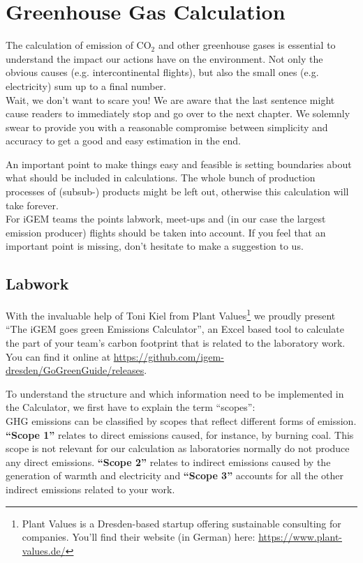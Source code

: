 
\chapter{Greenhouse Gas Calculation}\label{chap:calculation}

The calculation of emission of CO$_2$ and other greenhouse gases is essential to understand the impact our actions have on the environment. Not only the obvious causes (e.g. intercontinental flights), but also the small ones (e.g. electricity) sum up to a final number. \\
Wait, we don't want to scare you! We are aware that the last sentence might cause readers to immediately stop and go over to the next chapter.  We solemnly swear to provide you with a reasonable compromise between simplicity and accuracy to get a good and easy estimation in the end. 


An important point to make things easy and feasible is setting boundaries about what should be included in calculations. The whole bunch of production processes of (subsub-) products might be left out, otherwise this calculation will take forever. \\
For iGEM teams the points labwork, meet-ups and (in our case the largest emission producer) flights should be taken into account. If you feel that an important point is missing, don't hesitate to make a suggestion to us.

\section{Labwork}

With the invaluable help of Toni Kiel from Plant Values\footnote{Plant Values is a Dresden-based startup offering sustainable consulting for companies. You'll find their website (in German) here: \url{https://www.plant-values.de/}} we proudly present “The iGEM goes green Emissions Calculator”, an Excel based tool to calculate the part of your team's carbon footprint that is related to the laboratory work.  You can find it online at \url{https://github.com/igem-dresden/GoGreenGuide/releases}.


To understand the structure and which information need to be implemented in the Calculator, we first have to explain the term “scopes”: \\
GHG emissions can be classified by scopes that reflect different forms of emission. \textbf{“Scope 1”} relates to direct emissions caused, for instance, by burning coal. This scope is not relevant for our calculation as laboratories normally do not produce any direct emissions. \textbf{“Scope 2”} relates to indirect emissions caused by the generation of warmth and electricity and \textbf{“Scope 3”} accounts for all the other indirect emissions related to your work.


